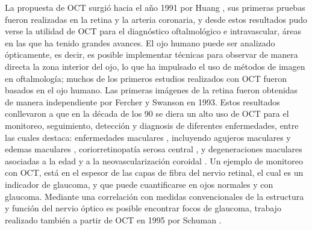 
La propuesta de OCT surgió hacia el año 1991 por Huang \etal \cite{Huang1991}, sus primeras pruebas fueron realizadas \exvivo en la retina y la arteria coronaria, y desde estos resultados pudo verse la utilidad de OCT para el diagnóstico oftalmológico e intravascular, áreas en las que ha tenido grandes avances. El ojo humano puede ser analizado ópticamente, es decir, es posible implementar técnicas para observar de manera directa la zona interior del ojo, lo que ha impulsado el uso de métodos de imagen en oftalmología; muchos de los primeros estudios realizados con OCT fueron basados en el ojo humano. Las primeras imágenes \invivo de la retina fueron obtenidas de manera independiente por Fercher \etal \cite{Fercher1993} y Swanson \etal \cite{Swanson1993} en 1993. Estos resultados conllevaron a que en la década de los 90 se diera un alto uso de OCT para el monitoreo, seguimiento, detección y diagnosis de diferentes enfermedades, entre las cuales destaca: enfermedades maculares \cite{Puliafito1995}, incluyendo agujeros maculares \cite{Hee1995_2} y edemas maculares \cite{Hee1995},  coriorretinopatía serosa central \cite{Hee1995_3}, y degeneraciones maculares asociadas a la edad y a la neovascularización coroidal \cite{Hee1995_4}. Un ejemplo de monitoreo con OCT, está en el espesor de las capas de fibra del nervio retinal, el cual es un indicador de glaucoma, y que puede cuantificarse en ojos normales y con glaucoma. Mediante una correlación con medidas convencionales de la estructura y función del nervio óptico es posible encontrar focos de glaucoma, trabajo realizado también a partir de OCT en 1995 por Schuman \etal \cite{Schuman1995}.

